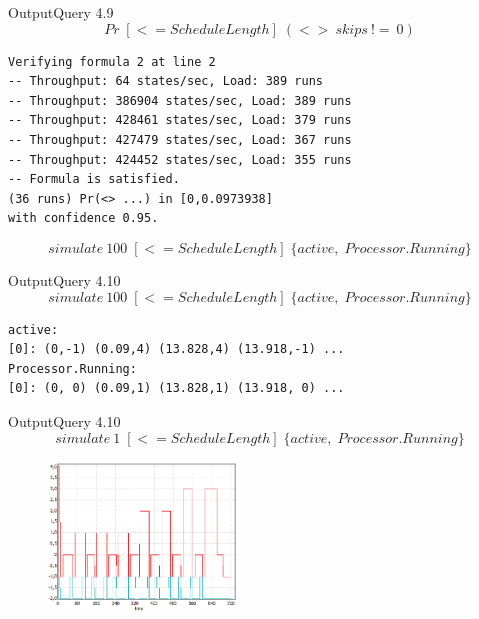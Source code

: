\begin{frame}[fragile]{Output}{Query 4.9}
	\begin{equation*}
Pr\; [<=ScheduleLength] \; (<> \ skips \ !=\ 0)
	\end{equation*}
	\begin{lstlisting}
Verifying formula 2 at line 2
-- Throughput: 64 states/sec, Load: 389 runs
-- Throughput: 386904 states/sec, Load: 389 runs
-- Throughput: 428461 states/sec, Load: 379 runs
-- Throughput: 427479 states/sec, Load: 367 runs
-- Throughput: 424452 states/sec, Load: 355 runs
-- Formula is satisfied.
(36 runs) Pr(<> ...) in [0,0.0973938]
with confidence 0.95.
	\end{lstlisting}
	\pause
	\begin{equation*}
		simulate\ 100 \; [<=ScheduleLength] \; \{active, \; Processor.Running\}
	\end{equation*}
\end{frame}

\begin{frame}[fragile]{Output}{Query 4.10}
	\begin{equation*}
		simulate\ 100 \; [<=ScheduleLength] \; \{active, \; Processor.Running\}
	\end{equation*}
	\begin{lstlisting}
active:
[0]: (0,-1) (0.09,4) (13.828,4) (13.918,-1) ...
Processor.Running:
[0]: (0, 0) (0.09,1) (13.828,1) (13.918, 0) ...
	\end{lstlisting}
\end{frame}

\begin{frame}{Output}{Query 4.10}
	\begin{equation*}
		simulate\ 1 \; [<=ScheduleLength] \; \{active, \; Processor.Running\}
	\end{equation*}
	\begin{figure} %
		\includegraphics[width=0.45\textwidth]{graphics/activeprocessor.png}
		\end{figure}
\end{frame}

